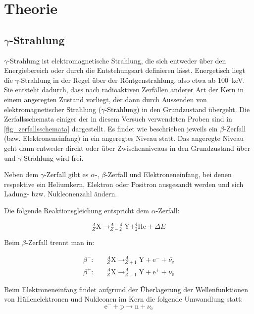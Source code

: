\documentclass[
	a4paper,
	12pt,
	pagesize,
	ngerman
]{scrartcl}
\begin{document}
  \section{Theorie}

	\subsection{$\gamma$-Strahlung}
	$\gamma$-Strahlung ist elektromagnetische Strahlung, die sich entweder über den Energiebereich oder durch die Entstehungsart definieren lässt.
	Energetisch liegt die $\gamma$-Strahlung in der Regel über der Röntgenstrahlung, also etwa ab \SI{100}{keV}.
	Sie entsteht dadurch, dass nach radioaktiven Zerfällen anderer Art der Kern in einem angeregten Zustand vorliegt, der dann durch Aussenden von elektromagnetischer Strahlung ($\gamma$-Strahlung) in den Grundzustand übergeht.
	Die Zerfallsschemata einiger der in diesem Versuch verwendeten Proben sind in \cref{fig_zerfallsschemata} dargestellt.
	Es findet wie beschrieben jeweils ein $\beta$-Zerfall (bzw. Elektroneneinfang) in ein angeregtes Niveau statt.
	Das angeregte Niveau geht dann entweder direkt oder über Zwischenniveaus in den Grundzustand über und $\gamma$-Strahlung wird frei.

	Neben dem $\gamma$-Zerfall gibt es $\alpha$-, $\beta$-Zerfall und Elektroneneinfang, bei denen respektive ein Heliumkern, Elektron oder Positron ausgesandt werden und sich Ladung- bzw. Nukleonenzahl ändern.

	Die folgende Reaktionsgleichung entspricht dem $\alpha$-Zerfall:

	\begin{equation}
		\label{eq_alphazerfall}
		 _{Z}^{A}\text{X} \rightarrow _{Z-2}^{A-4}\text{Y} + _{2}^{4}\text{He} +\Delta E
	\end{equation}

	Beim $\beta$-Zerfall trennt man in:

	\begin{align}
		\label{eq_beta-minus}
		\beta^-: \quad & _{Z}^{A}\text{X} \rightarrow _{Z+1}^{A}\text{Y} + \text{e}^- + \bar{\nu_{\text{e}}}\\
		\beta^+: \quad & _{Z}^{A}\text{X} \rightarrow _{Z-1}^{A}\text{Y} + \text{e}^+ + \nu_{\text{e}}
	\end{align}

	Beim Elektroneneinfang findet aufgrund der Überlagerung der Wellenfunktionen von Hüllenelektronen und Nukleonen im Kern die folgende Umwandlung statt:
	\begin{equation}
		\label{eq_elec_cap}
		\text{e}^- + \text{p} \rightarrow \text{n} + \nu_{\text{e}}
	\end{equation}
\end{document}
